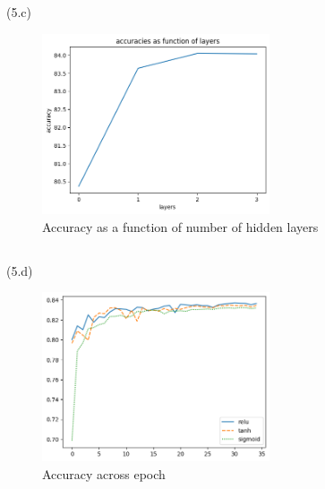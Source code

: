 \documentclass{article}
\begin{document}
\subsection{} %
\quad (5.c)
\begin{figure}[h]
\centering
\includegraphics[width=0.6\textwidth]{ims/5c.png}
\caption{Accuracy as a function of number of hidden layers}
\end{figure}
\subsection{} %
\quad (5.d)
\begin{figure}[h]
\centering
\includegraphics[width=0.6\textwidth]{ims/5d.png}
\caption{Accuracy across epoch}
\end{figure}
\end{document}
